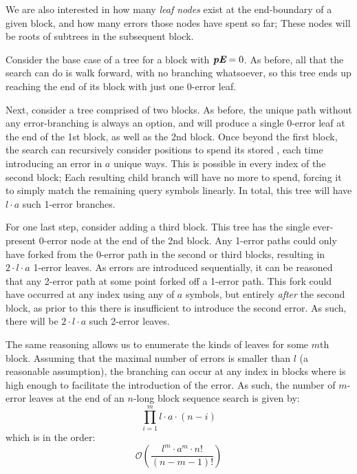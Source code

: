 \begin{enumerate}
We are also interested in how many \textit{leaf nodes} exist at the end-boundary of a given block, and how many errors those nodes have spent so far; These nodes will be roots of subtrees in the subsequent block.

Consider the base case of a tree for a block with $\textit{\textbf{pE}}=0$. As before, all that the search can do is walk forward, with no branching whatsoever, so this tree ends up reaching the end of its block with just one 0-error leaf.

Next, consider a tree comprised of two blocks. As before, the unique path without any error-branching is always an option, and will produce a single 0-error leaf at the end of the 1st block, as well as the 2nd block. Once beyond the first block, the search can recursively consider positions to spend its stored , each time introducing an error in $a$ unique ways. This is possible in every index of the second block; Each resulting child branch will have no more  to spend, forcing it to simply match the remaining query symbols linearly. In total, this tree will have $l \cdot{} a$ such 1-error branches.

For one last step, consider adding a third block. This tree has the single ever-present 0-error node at the end of the 2nd block. Any 1-error paths could only have forked from the 0-error path in the second or third blocks, resulting in $2 \cdot{} l \cdot{} a$ 1-error leaves. As errors are introduced sequentially, it can be reasoned that any 2-error path at some point forked off a 1-error path. This fork could have occurred at any index using any of $a$ symbols, but entirely \textit{after} the second block, as prior to this there is insufficient  to introduce the second error. As such, there will be $2 \cdot{} l \cdot{} a$ such 2-error leaves.

The same reasoning allows us to enumerate the kinds of leaves for some $m$th block. Assuming that the maximal number of errors is smaller than $l$ (a reasonable assumption), the branching can occur at any index in blocks where  is high enough to facilitate the introduction of the error. As such, the number of $m$-error leaves at the end of an $n$-long \gls{block sequence} search is given by:
$$\prod_{i=1}^{m} l \cdot{} a \cdot{} (n-i)$$
which is in the order:
$$\mathcal{O}(\dfrac{l^m \cdot{} a^m \cdot{} n!}{(n-m-1)!})$$



\end{enumerate}


